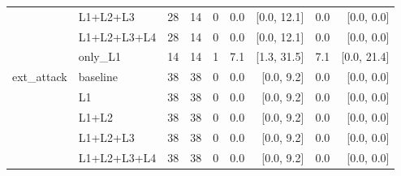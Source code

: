 \begin{tabular}{llrrrrrrr}
 & L1+L2+L3 & 28 & 14 & 0 & 0.0 & [0.0, 12.1] & 0.0 & [0.0, 0.0] \\
 & L1+L2+L3+L4 & 28 & 14 & 0 & 0.0 & [0.0, 12.1] & 0.0 & [0.0, 0.0] \\
 & only\_L1 & 14 & 14 & 1 & 7.1 & [1.3, 31.5] & 7.1 & [0.0, 21.4] \\
\midrule
ext\_attack & baseline & 38 & 38 & 0 & 0.0 & [0.0, 9.2] & 0.0 & [0.0, 0.0] \\
 & L1 & 38 & 38 & 0 & 0.0 & [0.0, 9.2] & 0.0 & [0.0, 0.0] \\
 & L1+L2 & 38 & 38 & 0 & 0.0 & [0.0, 9.2] & 0.0 & [0.0, 0.0] \\
 & L1+L2+L3 & 38 & 38 & 0 & 0.0 & [0.0, 9.2] & 0.0 & [0.0, 0.0] \\
 & L1+L2+L3+L4 & 38 & 38 & 0 & 0.0 & [0.0, 9.2] & 0.0 & [0.0, 0.0] \\
\bottomrule
\end{tabular}

